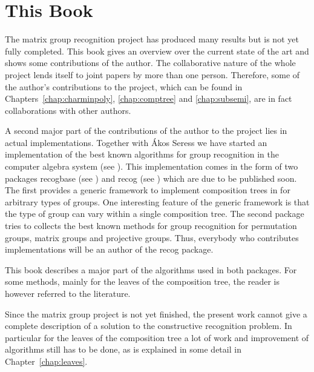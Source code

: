 \section{This Book}

The matrix group recognition project has produced many
results but is not yet fully completed.
This book gives an overview over the current state of the art and
shows some contributions of the author. The collaborative nature of the
whole project lends itself to joint papers by more than one person.
Therefore, some of the author's contributions to the project, which can
be found in Chapters~\ref{chap:charminpoly}, \ref{chap:comptree} and
\ref{chap:subsemi}, are in fact collaborations with other authors.

A second major part of the contributions of the author to the project lies
in actual implementations. Together with \'Akos Seress we have started an
implementation of the best known algorithms for group recognition in the
{\GAP} computer algebra system (see \cite{GAP4}). This implementation comes
in the form of two {\GAP} packages \textsf{recogbase} (see
\cite{recogbase}) and \textsf{recog} (see \cite{recog})
which are due to be published soon. The first provides a generic framework
to implement composition trees in {\GAP} for arbitrary types of groups. 
One interesting feature of the generic framework is that the type of group
can vary within a single composition tree. The
second package tries to collects the best known methods for group
recognition for permutation groups, matrix groups and projective groups.
Thus, everybody who contributes implementations will be an author of the
\textsf{recog} package. 

This book describes a major part of the algorithms used in both
packages. For some methods, mainly for the leaves of the composition tree,
the reader is however referred to the literature.

Since the matrix group project is not yet finished, the present work
cannot give a complete description of a solution to the constructive
recognition problem. In particular for the leaves of the composition tree
a lot of work and improvement of algorithms still has to be done, as is
explained in some detail in Chapter~\ref{chap:leaves}.

